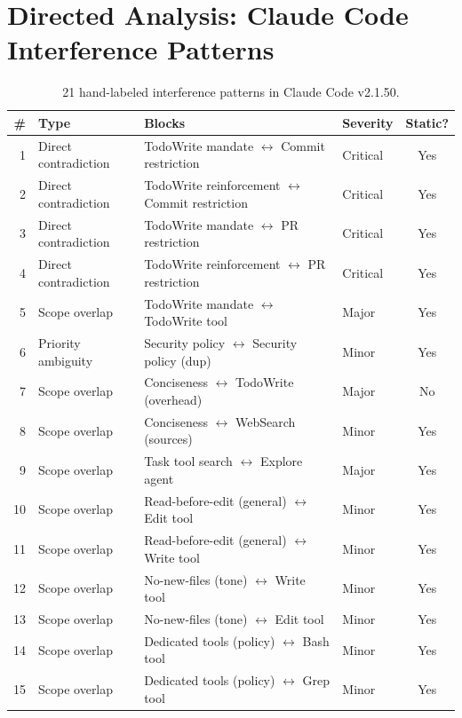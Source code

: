 \documentclass[11pt,a4paper]{article}
\begin{document}
\section{Directed Analysis: Claude Code Interference Patterns}
\label{app:interference}

\begin{table}[H]
\centering
\caption{21 hand-labeled interference patterns in Claude Code v2.1.50.}
\label{tab:interference-full}
\small
\begin{tabular}{@{}rlllc@{}}
\toprule
\# & Type & Blocks & Severity & Static? \\
\midrule
1 & Direct contradiction & TodoWrite mandate $\leftrightarrow$ Commit restriction & Critical & Yes \\
2 & Direct contradiction & TodoWrite reinforcement $\leftrightarrow$ Commit restriction & Critical & Yes \\
3 & Direct contradiction & TodoWrite mandate $\leftrightarrow$ PR restriction & Critical & Yes \\
4 & Direct contradiction & TodoWrite reinforcement $\leftrightarrow$ PR restriction & Critical & Yes \\
5 & Scope overlap & TodoWrite mandate $\leftrightarrow$ TodoWrite tool & Major & Yes \\
6 & Priority ambiguity & Security policy $\leftrightarrow$ Security policy (dup) & Minor & Yes \\
7 & Scope overlap & Conciseness $\leftrightarrow$ TodoWrite (overhead) & Major & No \\
8 & Scope overlap & Conciseness $\leftrightarrow$ WebSearch (sources) & Minor & Yes \\
9 & Scope overlap & Task tool search $\leftrightarrow$ Explore agent & Major & Yes \\
10 & Scope overlap & Read-before-edit (general) $\leftrightarrow$ Edit tool & Minor & Yes \\
11 & Scope overlap & Read-before-edit (general) $\leftrightarrow$ Write tool & Minor & Yes \\
12 & Scope overlap & No-new-files (tone) $\leftrightarrow$ Write tool & Minor & Yes \\
13 & Scope overlap & No-new-files (tone) $\leftrightarrow$ Edit tool & Minor & Yes \\
14 & Scope overlap & Dedicated tools (policy) $\leftrightarrow$ Bash tool & Minor & Yes \\
15 & Scope overlap & Dedicated tools (policy) $\leftrightarrow$ Grep tool & Minor & Yes \\

\end{tabular}
\end{table}
\end{document}
